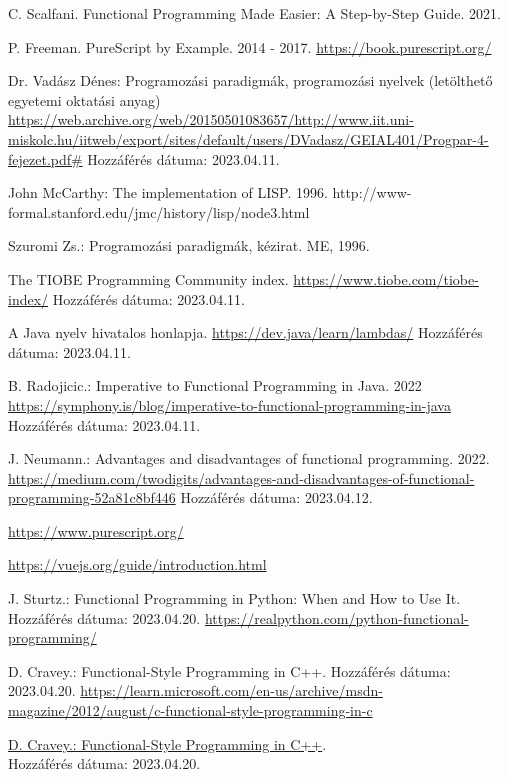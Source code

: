 \documentclass[12pt]{article}
\begin{document}

\newpage
\renewcommand{\refname}{Irodalomjegyzék}
\begin{thebibliography}{99}

C. Scalfani. Functional Programming Made Easier: A Step-by-Step Guide. 2021.

P. Freeman. PureScript by Example. 2014 - 2017.
\url{https://book.purescript.org/}

Dr. Vadász Dénes: Programozási paradigmák, programozási nyelvek (letölthető egyetemi oktatási anyag)
\url{https://web.archive.org/web/20150501083657/http://www.iit.uni-miskolc.hu/iitweb/export/sites/default/users/DVadasz/GEIAL401/Progpar-4-fejezet.pdf#}
Hozzáférés dátuma: 2023.04.11.

John McCarthy: The implementation of LISP. 1996.
http://www-formal.stanford.edu/jmc/history/lisp/node3.html

Szuromi Zs.: Programozási paradigmák, kézirat. ME, 1996.

The TIOBE Programming Community index. \url{https://www.tiobe.com/tiobe-index/} Hozzáférés dátuma: 2023.04.11.

A Java nyelv hivatalos honlapja. \url{https://dev.java/learn/lambdas/}  Hozzáférés dátuma: 2023.04.11.

B. Radojicic.: Imperative to Functional Programming in Java. 2022
\url{https://symphony.is/blog/imperative-to-functional-programming-in-java} Hozzáférés dátuma: 2023.04.11.

J. Neumann.: Advantages and disadvantages of functional programming. 2022.
\url{https://medium.com/twodigits/advantages-and-disadvantages-of-functional-programming-52a81c8bf446}
Hozzáférés dátuma: 2023.04.12.

\url{https://www.purescript.org/}

\url{https://vuejs.org/guide/introduction.html}

J. Sturtz.: Functional Programming in Python: When and How to Use It. Hozzáférés dátuma: 2023.04.20.
\url{https://realpython.com/python-functional-programming/}

D. Cravey.: Functional-Style Programming in C++. Hozzáférés dátuma: 2023.04.20.
\url{https://learn.microsoft.com/en-us/archive/msdn-magazine/2012/august/c-functional-style-programming-in-c}

\href{https://learn.microsoft.com/en-us/archive/msdn-magazine/2012/august/c-functional-style-programming-in-c}{D. Cravey.: Functional-Style Programming in C++}.\\ Hozzáférés dátuma: 2023.04.20.


\end{thebibliography}
\end{document}
